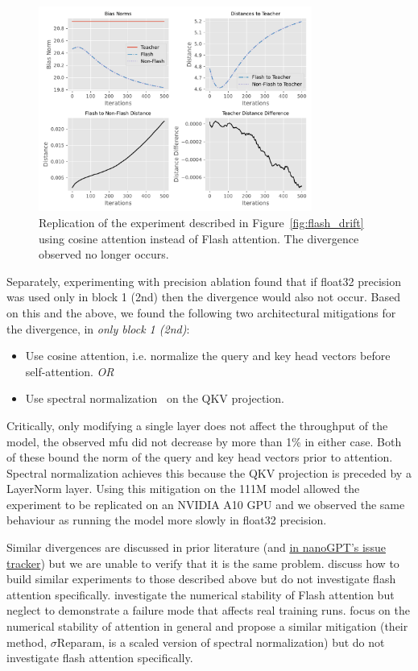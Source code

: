 \documentclass{article}
\begin{document}
\begin{figure}
    \centering
    \includegraphics[width=0.8\textwidth]{figures/flash_cosattn.pdf}
    \caption{%
        Replication of the experiment described in Figure~\ref{fig:flash_drift}
        using cosine attention instead of Flash attention. The divergence observed
        no longer occurs.}
    \label{fig:flash_cosattn}
\end{figure}

Separately, experimenting with precision ablation found that if float32
precision was used only in block 1 (2nd) then the divergence would also not
occur. Based on this and the above, we found the following two architectural
mitigations for the divergence, in \emph{only block 1 (2nd)}:

\begin{itemize}
    \item Use cosine attention, i.e. normalize the query and key head vectors before self-attention. \emph{OR}
    \item Use spectral normalization~\citep{miyato2018spectralnorm} on the QKV projection.
\end{itemize}

Critically, only modifying a single layer does not affect the throughput
of the model, the observed \ac{mfu} did not decrease by more than 1\% in either
case. Both of these bound the norm of the query and key head vectors prior to
attention. Spectral normalization achieves this because the QKV projection is
preceded by a LayerNorm layer. Using this mitigation on the 111M model allowed
the experiment to be replicated on an NVIDIA A10 GPU and we observed the same
behaviour as running the model more slowly in float32 precision.

Similar divergences are discussed in prior literature (and
\href{https://github.com/karpathy/nanoGPT/issues/137}{in nanoGPT's issue tracker})
but we are unable to verify that it is the same problem.
\citet{wortsman2023small} discuss how to build similar experiments to those
described above but do not investigate flash attention specifically.
\citet{golden2024flash} investigate the numerical stability of Flash attention
but neglect to demonstrate a failure mode that affects real training runs.
\citet{zhai2023stabilizing} focus on the numerical stability of attention in
general and propose a similar mitigation (their method, $\sigma$Reparam, is
a scaled version of spectral normalization) but do not investigate flash
attention specifically.
\end{document}
